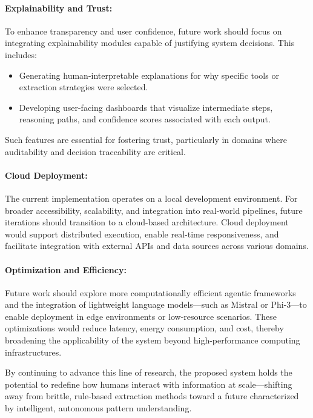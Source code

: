 \paragraph{Explainability and Trust:}
To enhance transparency and user confidence, future work should focus on integrating explainability modules capable of justifying system decisions. This includes:

\begin{itemize}
    \item Generating human-interpretable explanations for why specific tools or extraction strategies were selected.
    \item Developing user-facing dashboards that visualize intermediate steps, reasoning paths, and confidence scores associated with each output.
\end{itemize}

Such features are essential for fostering trust, particularly in domains where auditability and decision traceability are critical.


\paragraph{Cloud Deployment:}
The current implementation operates on a local development environment. For broader accessibility, scalability, and integration into real-world pipelines, future iterations should transition to a cloud-based architecture. Cloud deployment would support distributed execution, enable real-time responsiveness, and facilitate integration with external APIs and data sources across various domains.



\paragraph{Optimization and Efficiency:}
Future work should explore more computationally efficient agentic frameworks and the integration of lightweight language models—such as Mistral or Phi-3—to enable deployment in edge environments or low-resource scenarios. These optimizations would reduce latency, energy consumption, and cost, thereby broadening the applicability of the system beyond high-performance computing infrastructures.


\vspace{1.5cm}
\noindent
By continuing to advance this line of research, the proposed system holds the potential to redefine how humans interact with information at scale—shifting away from brittle, rule-based extraction methods toward a future characterized by intelligent, autonomous pattern understanding.




